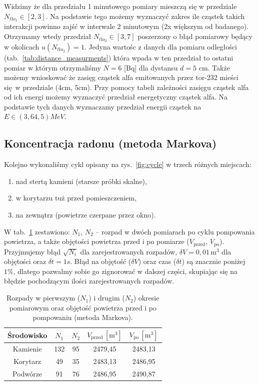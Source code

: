 \documentclass[12pt]{article}
\begin{document}
Widzimy że dla przedziału 1 minutowego pomiary mieszczą się w przedziale \(N_{tło_1} \in [2, 3]\). Na podstawie tego możemy wyznaczyć zakres ile cząstek takich interakcji powinno zajść w interwale 2 minutowym (2x większym od badanego).
Otrzymamy wtedy przedział \(N_{tło_2} \in [3,7]\) poszerzony o błąd pomiarowy będący w okolicach \(u(N_{tło_2}) = 1\).
Jedyna wartośc z danych dla pomiaru odległości (tab.~\ref{tab:distance_measurments}) która wpada w ten przedział to ostatni pomiar w którym otrzymaliśmy \(N = 6\) [Bq] dla dystansu \(d = 5\) cm. 
Także możemy wnioskować że zasięg cząstek alfa emitowanych przez tor-232 mieści się w przedziale (4cm, 5cm). Przy pomocy tabeli zależności zasięgu cząstek alfa od ich energi \cite{skrypt} możemy wyznaczyć przedział energetyczny cząstek alfa.
Na podstawie tych danych wyznaczamy przedział energii cząstek na \(E \in (3{,}6 4{,}5) MeV\).

\subsection{Koncentracja radonu (metoda Markova)}
Kolejno wykonaliśmy cykl opisany na rys.~\ref{fig:cycle} w trzech różnych miejscach: 
\begin{enumerate}[noitemsep]
	\item nad stertą kamieni (starsze próbki skalne),  
	\item w korytarzu tuż przed pomieszczeniem,  
	\item na zewnątrz (powietrze czerpane przez okno).
\end{enumerate}

W tab.~\ref{tab:density_measurments} zestawiono: $N_1$, $N_2$ – rozpad w dwóch pomiarach po cyklu pompowania powietrza, a także objętości powietrza przed i po pomiarze (\(V_{\text{przed}}\), \(V_{\text{po}}\)). Przyjmujemy błąd \(\sqrt{N_i}\) dla zarejestrowanych rozpadów, \(\delta V=0{,}01\,\mathrm{m^3}\) dla objętości oraz \(\delta t = 1s\).
Błąd na objętość (\(\delta V\)) oraz czas (\(\delta t\)) są znacznie poniżej \(1\%\), dlatego pozwalmy sobie go zignorować w dalszej części, skupiając się na błędzie pochodzącym ilości zarejestrowanych rozpadów.

\begin{table}[H]
	\centering
	\begin{tabular}{c|cc|cc}
		\toprule
		Środowisko & $N_1$ & $N_2$ & $V_{\text{przed}}\,[\mathrm{m^3}]$ & $V_{\text{po}}\,[\mathrm{m^3}]$ \\
		\midrule
		Kamienie & 132 & 95 & 2479{,}45 & 2483{,}13 \\
		Korytarz & 49  & 35 & 2483{,}13 & 2486{,}95 \\
		Podwórze & 91  & 76 & 2486{,}95 & 2490{,}87 \\
		\bottomrule
	\end{tabular}
	\caption{Rozpady w pierwszym ($N_1$) i drugim ($N_2$) okresie pomiarowym oraz objętość powietrza przed i po pompowaniu (metoda Markova).}
	\label{tab:density_measurments}
\end{table}
\end{document}
